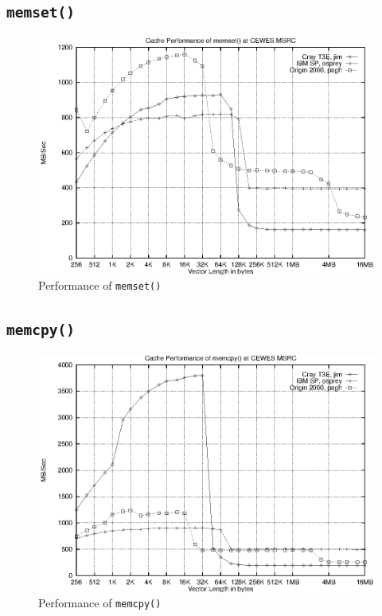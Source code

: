 \documentclass [12pt]{article}
\begin{document}
\subsection{{\tt memset()}}
\begin{figure}[Hht]
\centerline{\includegraphics{pics/cache_cewes_memset.ps}}
\caption{Performance of {\tt memset()}}\label{memset}
\end{figure}

\subsection{{\tt memcpy()}}
\begin{figure}[Hht]
\centerline{\includegraphics{pics/cache_cewes_memcpy.ps}}
\caption{Performance of {\tt memcpy()}}\label{memcpy}
\end{figure}
\end{document}
